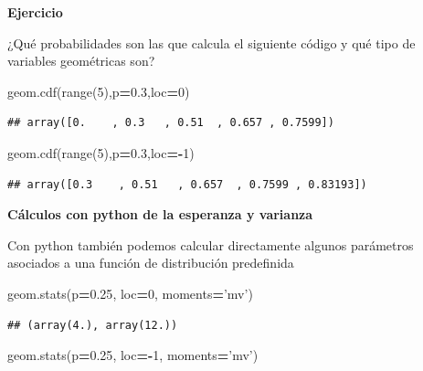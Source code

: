 \documentclass[]{book}
\newenvironment{Shaded}{\begin{snugshade}}{\end{snugshade}}
\newcommand{\BuiltInTok}[1]{#1}
\newcommand{\DecValTok}[1]{\textcolor[rgb]{0.00,0.00,0.81}{#1}}
\newcommand{\FloatTok}[1]{\textcolor[rgb]{0.00,0.00,0.81}{#1}}
\newcommand{\NormalTok}[1]{#1}
\newcommand{\OperatorTok}[1]{\textcolor[rgb]{0.81,0.36,0.00}{\textbf{#1}}}
\newcommand{\StringTok}[1]{\textcolor[rgb]{0.31,0.60,0.02}{#1}}
\begin{document}
\textbf{Ejercicio}

¿Qué probabilidades son las que calcula el siguiente código y qué tipo de variables geométricas son?

\begin{Shaded}
\begin{Highlighting}[]
\NormalTok{geom.cdf(}\BuiltInTok{range}\NormalTok{(}\DecValTok{5}\NormalTok{),p}\OperatorTok{=}\FloatTok{0.3}\NormalTok{,loc}\OperatorTok{=}\DecValTok{0}\NormalTok{)}
\end{Highlighting}
\end{Shaded}

\begin{verbatim}
## array([0.    , 0.3   , 0.51  , 0.657 , 0.7599])
\end{verbatim}

\begin{Shaded}
\begin{Highlighting}[]
\NormalTok{geom.cdf(}\BuiltInTok{range}\NormalTok{(}\DecValTok{5}\NormalTok{),p}\OperatorTok{=}\FloatTok{0.3}\NormalTok{,loc}\OperatorTok{=-}\DecValTok{1}\NormalTok{)}
\end{Highlighting}
\end{Shaded}

\begin{verbatim}
## array([0.3    , 0.51   , 0.657  , 0.7599 , 0.83193])
\end{verbatim}

\textbf{Cálculos con python de la esperanza y varianza}

Con python también podemos calcular directamente algunos parámetros asociados a una función de distribución predefinida

\begin{Shaded}
\begin{Highlighting}[]
\NormalTok{geom.stats(p}\OperatorTok{=}\FloatTok{0.25}\NormalTok{, loc}\OperatorTok{=}\DecValTok{0}\NormalTok{, moments}\OperatorTok{=}\StringTok{'mv'}\NormalTok{)}
\end{Highlighting}
\end{Shaded}

\begin{verbatim}
## (array(4.), array(12.))
\end{verbatim}

\begin{Shaded}
\begin{Highlighting}[]
\NormalTok{geom.stats(p}\OperatorTok{=}\FloatTok{0.25}\NormalTok{, loc}\OperatorTok{=-}\DecValTok{1}\NormalTok{, moments}\OperatorTok{=}\StringTok{'mv'}\NormalTok{)}
\end{Highlighting}
\end{Shaded}
\end{document}
